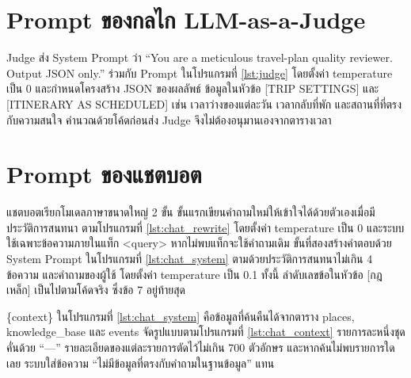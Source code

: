 





\section{Prompt ของกลไก LLM-as-a-Judge}

Judge ส่ง System Prompt ว่า ``You are a meticulous travel-plan quality reviewer. Output JSON only.'' ร่วมกับ Prompt ในโปรแกรมที่ \ref{lst:judge} โดยตั้งค่า temperature เป็น 0 และกำหนดโครงสร้าง JSON ของผลลัพธ์ ข้อมูลในหัวข้อ [TRIP SETTINGS] และ [ITINERARY AS SCHEDULED] เช่น เวลาว่างของแต่ละวัน เวลากลับที่พัก และสถานที่ที่ตรงกับความสนใจ คำนวณด้วยโค้ดก่อนส่ง Judge จึงไม่ต้องอนุมานเองจากตารางเวลา



\section{Prompt ของแชตบอต}

แชตบอตเรียกโมเดลภาษาขนาดใหญ่ 2 ขั้น ขั้นแรกเขียนคำถามใหม่ให้เข้าใจได้ด้วยตัวเองเมื่อมีประวัติการสนทนา ตามโปรแกรมที่ \ref{lst:chat_rewrite} โดยตั้งค่า temperature เป็น 0 และระบบใช้เฉพาะข้อความภายในแท็ก <query> หากไม่พบแท็กจะใช้คำถามเดิม ขั้นที่สองสร้างคำตอบด้วย System Prompt ในโปรแกรมที่ \ref{lst:chat_system} ตามด้วยประวัติการสนทนาไม่เกิน 4 ข้อความ และคำถามของผู้ใช้ โดยตั้งค่า temperature เป็น 0.1 ทั้งนี้ ลำดับเลขข้อในหัวข้อ [กฎเหล็ก] เป็นไปตามโค้ดจริง ซึ่งข้อ 7 อยู่ท้ายสุด





\{context\} ในโปรแกรมที่ \ref{lst:chat_system} คือข้อมูลที่ค้นคืนได้จากตาราง places, knowledge\_base และ events จัดรูปแบบตามโปรแกรมที่ \ref{lst:chat_context} รายการละหนึ่งชุดคั่นด้วย ``---'' รายละเอียดของแต่ละรายการตัดไว้ไม่เกิน 700 ตัวอักษร และหากค้นไม่พบรายการใดเลย ระบบใส่ข้อความ ``ไม่มีข้อมูลที่ตรงกับคำถามในฐานข้อมูล'' แทน


